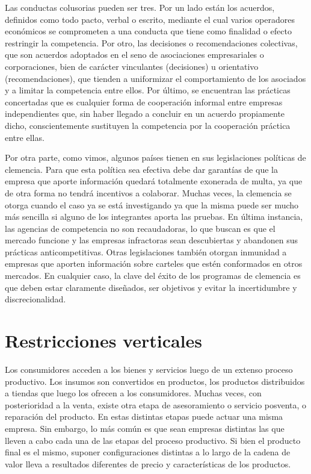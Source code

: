 \documentclass[
  12pt,
  spanish,
]{book}
\begin{document}
Las conductas colusorias pueden ser tres. Por un lado están los acuerdos, definidos como todo pacto, verbal o escrito, mediante el cual varios operadores económicos se comprometen a una conducta que tiene como finalidad o efecto restringir la competencia. Por otro, las decisiones o recomendaciones colectivas, que son acuerdos adoptados en el seno de asociaciones empresariales o corporaciones, bien de carácter vinculantes (decisiones) u orientativo (recomendaciones), que tienden a uniformizar el comportamiento de los asociados y a limitar la competencia entre ellos. Por último, se encuentran las prácticas concertadas que es cualquier forma de cooperación informal entre empresas independientes que, sin haber llegado a concluir en un acuerdo propiamente dicho, conscientemente sustituyen la competencia por la cooperación práctica entre ellas.

Por otra parte, como vimos, algunos países tienen en sus legislaciones políticas de clemencia. Para que esta política sea efectiva debe dar garantías de que la empresa que aporte información quedará totalmente exonerada de multa, ya que de otra forma no tendrá incentivos a colaborar. Muchas veces, la clemencia se otorga cuando el caso ya se está investigando ya que la misma puede ser mucho más sencilla si alguno de los integrantes aporta las pruebas. En última instancia, las agencias de competencia no son recaudadoras, lo que buscan es que el mercado funcione y las empresas infractoras sean descubiertas y abandonen sus prácticas anticompetitivas. Otras legislaciones también otorgan inmunidad a empresas que aporten información sobre carteles que estén conformados en otros mercados. En cualquier caso, la clave del éxito de los programas de clemencia es que deben estar claramente diseñados, ser objetivos y evitar la incertidumbre y discrecionalidad.

\hypertarget{rest-vert}{%
\section{Restricciones verticales}\label{rest-vert}}

Los consumidores acceden a los bienes y servicios luego de un extenso proceso productivo. Los insumos son convertidos en productos, los productos distribuidos a tiendas que luego los ofrecen a los consumidores. Muchas veces, con posterioridad a la venta, existe otra etapa de asesoramiento o servicio posventa, o reparación del producto. En estas distintas etapas puede actuar una misma empresa. Sin embargo, lo más común es que sean empresas distintas las que lleven a cabo cada una de las etapas del proceso productivo. Si bien el producto final es el mismo, suponer configuraciones distintas a lo largo de la cadena de valor lleva a resultados diferentes de precio y características de los productos.
\end{document}
